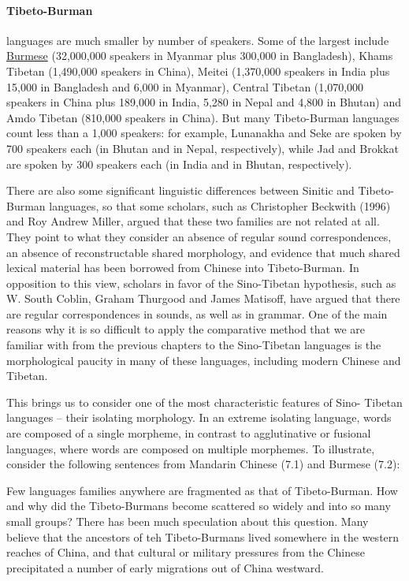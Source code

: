 \paragraph{Tibeto-Burman} languages are much smaller by number of speakers.
Some of the largest include \hyperref[s:myanmar]{Burmese} (32,000,000 speakers in Myanmar plus
300,000 in Bangladesh), Khams Tibetan (1,490,000 speakers in China), Meitei
(1,370,000 speakers in India plus 15,000 in Bangladesh and 6,000 in Myanmar),
Central Tibetan (1,070,000 speakers in China plus 189,000 in India, 5,280 in
Nepal and 4,800 in Bhutan) and Amdo Tibetan (810,000 speakers in China). But
many Tibeto-Burman languages count less than a 1,000 speakers: for example,
Lunanakha and Seke are spoken by 700 speakers each (in Bhutan and in Nepal,
respectively), while Jad and Brokkat are spoken by 300 speakers each (in India
and in Bhutan, respectively).




There are also some significant linguistic differences between Sinitic and
Tibeto-Burman languages, so that some scholars, such as Christopher Beckwith
(1996) and Roy Andrew Miller, argued that these two families are not related
at all. They point to what they consider an absence of regular sound correspondences,
an absence of reconstructable shared morphology, and evidence that much
shared lexical material has been borrowed from Chinese into Tibeto-Burman. In
opposition to this view, scholars in favor of the Sino-Tibetan hypothesis, such
as W. South Coblin, Graham Thurgood and James Matisoff, have argued that
there are regular correspondences in sounds, as well as in grammar. One of the
main reasons why it is so difficult to apply the comparative method that we are
familiar with from the previous chapters to the Sino-Tibetan languages is the
morphological paucity in many of these languages, including modern Chinese
and Tibetan.

This brings us to consider one of the most characteristic features of Sino-
Tibetan languages – their isolating morphology. In an extreme isolating
language, words are composed of a single morpheme, in contrast to agglutinative
or fusional languages, where words are composed on multiple morphemes. To
illustrate, consider the following sentences from Mandarin Chinese (7.1) and
Burmese (7.2):


Few languages families anywhere are fragmented as that of Tibeto-Burman. How and why did the Tibeto-Burmans become
scattered so widely and into so many small groups? There has been much speculation about this question. Many
believe that the ancestors of teh Tibeto-Burmans lived somewhere in the western reaches of China, and that
cultural or military pressures from the Chinese precipitated a number of early migrations out of China
westward. 



